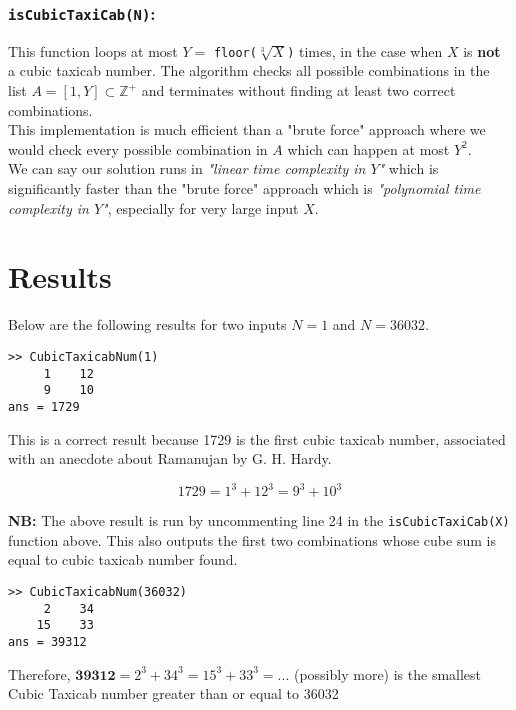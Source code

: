\documentclass[12pt]{report}
\begin{document}
\subsubsection{\texttt{isCubicTaxiCab(N)}:}
This function loops at most $Y=$ \texttt{floor($\sqrt[3]{X}$)} times, in the case when $X$ is \textbf{not} a cubic taxicab number. The algorithm checks all possible combinations in the list $A=[1,Y]\subset\mathbb{Z^+}$ and terminates without finding at least two correct combinations. \\

This implementation is much efficient than a "brute force" approach where we would check every possible combination in $A$ which can happen at most $Y^2$. \\

We can say our solution runs in \textit{"linear time complexity in $Y$"} which is significantly faster than the "brute force" approach which is \textit{"polynomial time complexity in $Y$"}, especially for very large input $X$.

\section{Results}
Below are the following results for two inputs $N=1$ and $N=36032$. \\

\begin{lstlisting}[title={N=1}]
>> CubicTaxicabNum(1)
     1    12
     9    10
ans = 1729
\end{lstlisting}

This is a correct result because 1729 is the first cubic taxicab number, associated with an anecdote about Ramanujan by G. H. Hardy.

\begin{equation*}
	1729 = 1^3 + 12^3 = 9^3 + 10^3
\end{equation*}

\textbf{NB:} The above result is run by uncommenting line 24 in the \texttt{isCubicTaxiCab(X)} function above. This also outputs the first two combinations whose cube sum is equal to cubic taxicab number found. \\
\begin{lstlisting}[title={N=36032}]
>> CubicTaxicabNum(36032)
     2    34
    15    33
ans = 39312
\end{lstlisting}
Therefore, $\textbf{39312} = 2^3 +34^3 = 15^3 + 33^3 = ...$ (possibly more) is the smallest Cubic Taxicab number greater than or equal to 36032
\end{document}
